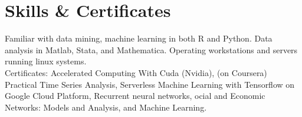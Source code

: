 \documentclass[a4paper,10pt]{article}
\begin{document}


\section{Skills \& Certificates}
	\par Familiar with data mining, machine learning in both R and Python. Data analysis in Matlab, Stata, and Mathematica. Operating workstations and servers running linux systems. \\
	Certificates: Accelerated Computing With Cuda (Nvidia), (on Coursera) Practical Time Series Analysis, Serverless Machine Learning with Tensorflow on Google Cloud Platform, Recurrent neural networks, ocial and Economic Networks: Models and Analysis, and Machine Learning.
    
\end{document}

